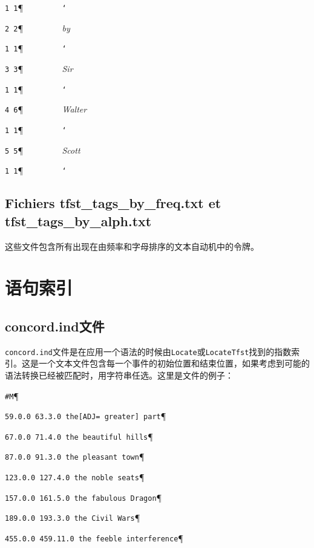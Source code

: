 \noindent \verb$1 1$\P \verb$         $\texttt{\char `\ }

\noindent \verb$2 2$\P \verb$         $\textit{by}

\noindent \verb$1 1$\P \verb$         $\texttt{\char `\ }

\noindent \verb$3 3$\P \verb$         $\textit{Sir}

\noindent \verb$1 1$\P \verb$         $\texttt{\char `\ }

\noindent \verb$4 6$\P \verb$         $\textit{Walter}

\noindent \verb$1 1$\P \verb$         $\texttt{\char `\ }

\noindent \verb$5 5$\P \verb$         $\textit{Scott}

\noindent \verb$1 1$\P \verb$         $\texttt{\char `\ }


\subsection{Fichiers tfst\_tags\_by\_freq.txt et tfst\_tags\_by\_alph.txt}
这些文件包含所有出现在由频率和字母排序的文本自动机中的令牌。


\section{语句索引}
\subsection{ concord.ind文件}
 \verb+concord.ind+文件是在应用一个语法的时候由\verb+Locate+或\verb+LocateTfst+找到的指数索引。这是一个文本文件包含每一个事件的初始位置和结束位置，如果考虑到可能的语法转换已经被匹配时，用字符串任选。这里是文件的例子：


\bigskip
\verb$#M$\P

\verb$59.0.0 63.3.0 the[ADJ= greater] part$\P

\verb$67.0.0 71.4.0 the beautiful hills$\P

\verb$87.0.0 91.3.0 the pleasant town$\P

\verb$123.0.0 127.4.0 the noble seats$\P

\verb$157.0.0 161.5.0 the fabulous Dragon$\P

\verb$189.0.0 193.3.0 the Civil Wars$\P

\verb$455.0.0 459.11.0 the feeble interference$\P

